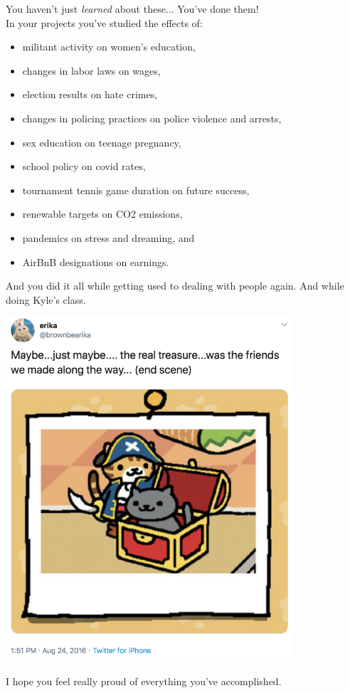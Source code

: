 \documentclass[11pt]{beamer}
\begin{document}
\begin{frame}[t]{You haven't just \emph{learned} about these...}
You've done them! \\
\pause 
In your projects you've studied the effects of:
\begin{itemize}
    \item militant activity on women's education,
    \item changes in labor laws on wages,
    \item election results on hate crimes,
    \item changes in policing practices on police violence and arrests,
    \item sex education on teenage pregnancy,
    \item school policy on covid rates, 
    \item tournament tennis game duration on future success,
    \item renewable targets on CO2 emissions,
    \item pandemics on stress and dreaming, and
    \item AirBnB designations on earnings.
\end{itemize}
\pause And you did it all while getting used to dealing with \alert{people} again.
\pause And while doing \alert{Kyle's class}.
\end{frame}
    

\begin{frame}[c]
\pause 
\centering
      \includegraphics[width=0.8\textwidth]{maybe_the_real_treasure.png}
\end{frame}

\begin{frame}[c]
    \centering 
    \alert{I hope you feel really proud of everything you've accomplished.}
\end{frame}
    
\end{document}
